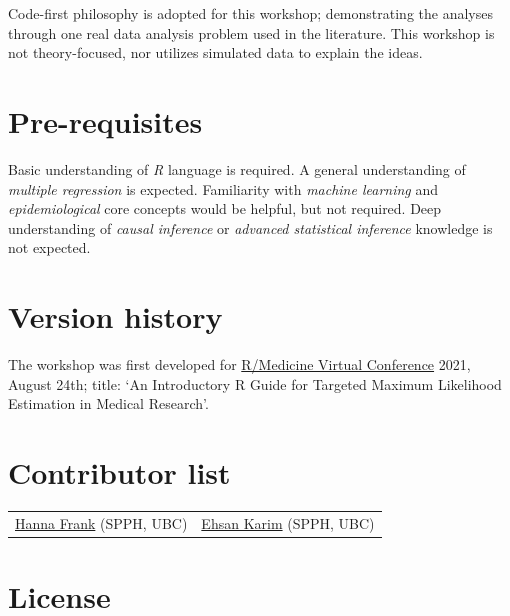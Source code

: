 \documentclass[
]{book}
\begin{document}
Code-first philosophy is adopted for this workshop; demonstrating the analyses through one real data analysis problem used in the literature. This workshop is not theory-focused, nor utilizes simulated data to explain the ideas.

\hypertarget{pre-requisites}{%
\section*{Pre-requisites}\label{pre-requisites}}

Basic understanding of \emph{R} language is required. A general understanding of \emph{multiple regression} is expected. Familiarity with \emph{machine learning} and \emph{epidemiological} core concepts would be helpful, but not required. Deep understanding of \emph{causal inference} or \emph{advanced statistical inference} knowledge is not expected.

\hypertarget{version-history}{%
\section*{Version history}\label{version-history}}

The workshop was first developed for \href{https://r-medicine.org/schedule/}{R/Medicine
Virtual Conference} 2021, August 24th; title: `An Introductory R Guide for Targeted Maximum Likelihood Estimation in Medical Research'.

\hypertarget{contributor-list}{%
\section*{Contributor list}\label{contributor-list}}

\begin{longtable}[]{@{}ll@{}}
\toprule
& \\
\midrule
\endhead
\href{https://www.linkedin.com/in/hanna-f-940813b9/}{Hanna Frank} (SPPH, UBC) & \href{https://ehsank.com/}{Ehsan Karim} (SPPH, UBC) \\
\bottomrule
\end{longtable}

\hypertarget{license}{%
\section*{License}\label{license}}
\end{document}
